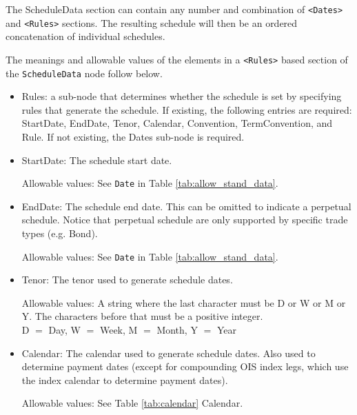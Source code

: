 The ScheduleData section can contain any number and combination of
{\tt <Dates>} and {\tt <Rules>} sections. The resulting schedule will
then be an ordered concatenation of individual schedules.
 
\medskip
The meanings and allowable values of the elements in a {\tt <Rules>} based section of the  \lstinline!ScheduleData! node follow below.

\begin{itemize}
\item Rules: a sub-node that determines whether the schedule is set by specifying rules that
generate the schedule. If existing, the following entries are required: StartDate, EndDate, Tenor, Calendar, 
Convention, TermConvention, and Rule. If not existing, the Dates
sub-node is required.
\item StartDate:  The schedule start date.  

Allowable values:  See \lstinline!Date! in Table \ref{tab:allow_stand_data}.

\item EndDate: The schedule end date. This can be omitted to indicate a perpetual schedule. Notice that perpetual
  schedule are only supported by specific trade types (e.g. Bond).

Allowable values:  See \lstinline!Date! in Table \ref{tab:allow_stand_data}.

\item Tenor: The tenor used to generate schedule dates. 

Allowable values: A string where the last character must be D or W or
M or Y.  The characters before that must be a positive integer. \\D
$=$ Day, W $=$ Week, M $=$ Month, Y $=$ Year

\item Calendar: The calendar used to generate schedule  dates. Also used to determine payment dates (except for compounding OIS index legs, which use the index calendar to determine payment dates).

Allowable values: See Table \ref{tab:calendar} Calendar.


\end{itemize}
